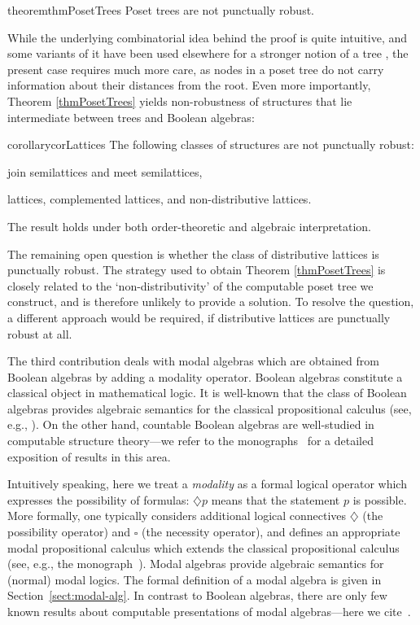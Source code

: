 \documentclass[a4paper,UKenglish,cleveref, autoref, thm-restate]{lipics-v2021}
\begin{document}
\begin{restatable}{theorem}{thmPosetTrees}\label{thmPosetTrees}
    Poset trees are not punctually robust.
\end{restatable} While the underlying combinatorial idea behind the proof is quite intuitive, and some variants of it have been used elsewhere for a stronger notion of a tree \cite{cenzer_feasible_1998}, the present case requires much more care, as nodes in a poset tree do not carry information about their distances from the root. Even more importantly, Theorem \ref{thmPosetTrees} yields non-robustness of structures that lie intermediate between trees and Boolean algebras:


\begin{restatable}{corollary}{corLattices}\label{cor:lattices} The following classes of structures are not punctually robust:
\begin{romanenumerate}
    \item join semilattices and meet semilattices,\label{item semilattices} 
    \item lattices, complemented lattices, and non-distributive lattices.\label{item lattices}
\end{romanenumerate}
The result holds under both order-theoretic and algebraic interpretation. 
\end{restatable}


The remaining open question is whether the class of distributive lattices is punctually robust. The strategy used to obtain Theorem \ref{thmPosetTrees} is closely related to the `non-distributivity' of the computable poset tree we construct, and is therefore unlikely to provide a solution. To resolve the question, a different approach would be required, if distributive lattices are punctually robust at all. 




The third contribution deals with modal algebras which are obtained from Boolean algebras by adding a modality operator. Boolean algebras constitute a classical object in mathematical logic. It is well-known that the class of Boolean algebras provides algebraic semantics for the classical propositional calculus (see, e.g., \cite{Rasiowa-Sikorski}). On the other hand, countable Boolean algebras are well-studied in computable structure theory---we refer to the monographs~\cite{Goncharov-Book,Downey-Melnikov-Book} for a detailed exposition of results in this area. 

Intuitively speaking, here we treat a \emph{modality} as a formal logical operator which expresses the possibility of formulas: $\diamondsuit p$ means that the statement $p$ is possible. More formally, one typically considers additional logical connectives $\diamondsuit$ (the possibility operator) and $\square$ (the necessity operator), and defines an appropriate modal propositional calculus which extends the classical propositional calculus (see, e.g., the monograph~\cite{CZ-Modal-Logic}). Modal algebras provide algebraic semantics for (normal) modal logics. The formal definition of a modal algebra is given in Section~\ref{sect:modal-alg}. In contrast to Boolean algebras, there are only few known results about computable presentations of modal algebras---here we cite~\cite{KK-12,Bazh-16}. 
\end{document}
